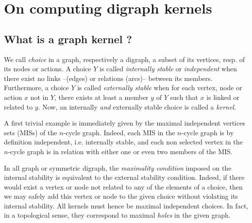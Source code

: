 \chapter{On computing digraph kernels}
\label{sec:17}

\abstract*{}

\abstract{}

\section{What is a graph kernel ?}
\label{sec:17.1}

We call \emph{choice} in a graph, respectively a digraph, a subset of its vertices, resp. of its nodes or actions. A choice $Y$ is called \emph{internally stable} or \emph{independent} when there exist no links --(edges) or relations (arcs)-- between its members. Furthermore, a choice $Y$ is called \emph{externally stable} when for each vertex, node or action $x$ not in $Y$, there exists at least a member $y$ of $Y$ such that $x$ is linked or related to $y$. Now, an internally \emph{and} externally stable choice is called a \emph{kernel}.  

A first trivial example is immediately given by the maximal independent vertices sets (MISs) of the $n$-cycle graph. Indeed, each MIS in the $n$-cycle graph is by definition independent, i.e. internally stable, and each non selected vertex in the $n$-cycle graph is in relation with either one or even two members of the MIS.

In all graph or symmetric digraph, the \emph{maximality condition} imposed on the internal stability is equivalent to the external stability condition. Indeed, if there would exist a vertex or node not related to any of the elements of a choice, then we may safely add this vertex or node to the given choice without violating its internal stability. All kernels must hence be maximal independent choices. In fact, in a topological sense, they correspond to maximal \emph{holes} in the given graph.

